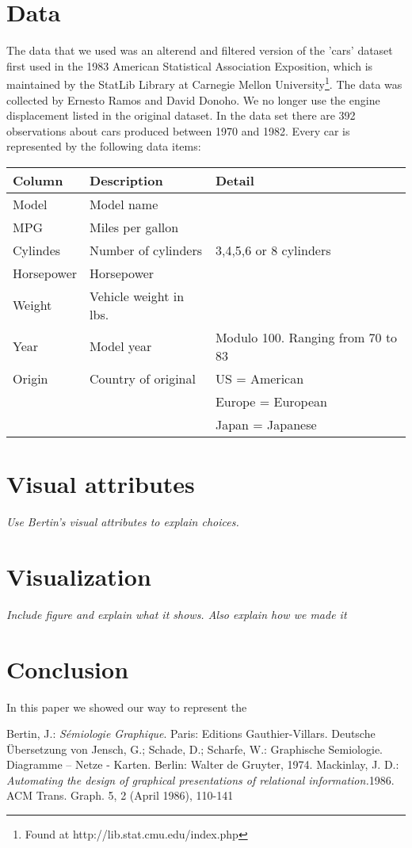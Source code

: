 \documentclass{article}
\begin{document}
\section{Data}
The data that we used was an alterend and filtered version of the 'cars' dataset first used in the 1983 American Statistical Association Exposition, which is maintained by the StatLib Library at Carnegie Mellon University\footnote{Found at http://lib.stat.cmu.edu/index.php}. The data was collected by Ernesto Ramos and David Donoho. We no longer use the engine displacement listed in the original dataset. In the data set there are 392 observations about cars produced between 1970 and 1982. Every car is represented by the following data items:
\begin{center}
	\begin{tabular}{| l | l | l |}
	\hline
	\textbf{Column} & \textbf{Description} & \textbf{Detail} \\ \hline
	Model & Model name & \\ \hline
	MPG & Miles per gallon & \\ \hline
	Cylindes & Number of cylinders & 3,4,5,6 or 8 cylinders \\ \hline
	Horsepower & Horsepower &  \\ \hline
	Weight & Vehicle weight in lbs. & \\ \hline
	Year & Model year & Modulo 100. Ranging from 70 to 83\\ \hline
	Origin & Country of original & US = American \\&& Europe = European \\ &&Japan = Japanese \\ \hline
	\end{tabular}
\end{center}

\section{Visual attributes}
\textit{Use Bertin's visual attributes to explain choices.}

\section{Visualization}
\textit{Include figure and explain what it shows. Also explain how we made it}

\section{Conclusion}
In this paper we showed our way to represent the 


\begin{thebibliography}{99}
Bertin, J.: \emph{Sémiologie Graphique}. Paris: Editions Gauthier-Villars. Deutsche Übersetzung von Jensch, G.; Schade, D.; Scharfe, W.: Graphische Semiologie. Diagramme – Netze - Karten. Berlin: Walter de Gruyter, 1974.
Mackinlay, J. D.: \emph{Automating the design of graphical presentations of relational information.}1986. ACM Trans. Graph. 5, 2 (April 1986), 110-141
\end{thebibliography}
\end{document}
